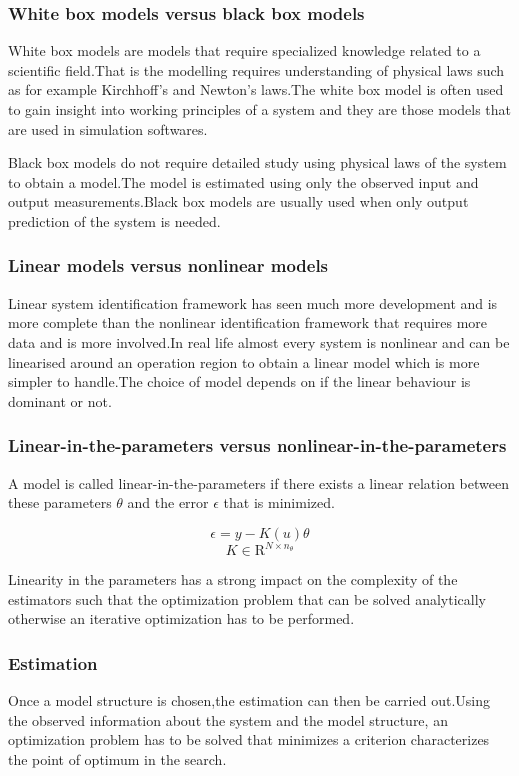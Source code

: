 \documentclass[a4paper,12pt]{article}
\numberwithin{equation}{section}
\begin{document}
\subsubsection*{ White box models versus black box models }
White box models are models that require specialized knowledge related to a scientific field.That is the modelling requires understanding of physical laws such as for example Kirchhoff’s and Newton’s laws.The white box model is often used to gain insight into working principles of a system and they are those models that are used in simulation softwares.

Black box models do not require detailed study using physical laws of the system to obtain a model.The model is estimated  using only the observed input and output measurements.Black box models are usually used when only output prediction of the system is needed. 

\subsubsection*{ Linear models versus nonlinear models }
Linear system identification framework has seen much more development and is more complete than the nonlinear identification framework that  requires more data and is more involved.In real life almost every system is nonlinear and  can be linearised around an operation region to obtain a linear model which is more simpler to handle.The choice of model depends on if the linear behaviour is dominant or not.

\subsubsection*{ Linear-in-the-parameters versus nonlinear-in-the-parameters }
A model is called linear-in-the-parameters if there exists a linear relation between these parameters $\theta$ and the error $\epsilon$ that is minimized.

\[\epsilon=y-K(u) \theta\]
\[K \in \mathrm{R}^{N \times n_{\theta}}\]

Linearity in the parameters has a strong impact on the complexity of the estimators such that the optimization problem that can be solved analytically  otherwise an iterative optimization has to be performed.

\subsubsection{ Estimation}
Once a model structure is chosen,the estimation can then be carried out.Using the observed information about the system and the model structure, an optimization problem has to be solved that minimizes a criterion characterizes the point of optimum in the search.
\end{document}
